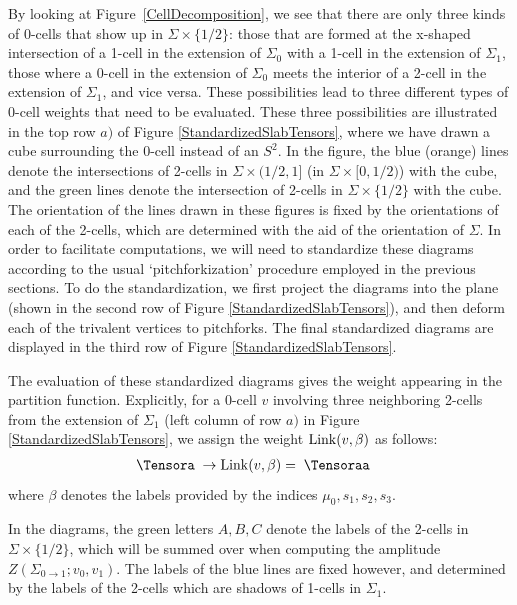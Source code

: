 \documentclass[12pt,a4paper]{article}
\newcounter{arrow}
\newcommand{\tp}{\otimes}
\newcommand{\ra}{\rightarrow}
\begin{document}
By looking at Figure~\ref{CellDecomposition}, we see that there are only three kinds of 0-cells that show up in 
$\Sigma \times \{1/2\}$: those that are formed at the x-shaped intersection of a 1-cell in the extension of $
\Sigma_0$ with a 1-cell in the extension of $\Sigma_1$, those where a 0-cell in the extension of $\Sigma_0$ 
meets the interior of a 2-cell in 
the extension of $\Sigma_1$, and vice versa. These possibilities lead to three different types of 0-cell weights that need to be evaluated. 
These three possibilities are illustrated in the top row $a)$ of Figure \ref{StandardizedSlabTensors}, where we have drawn a cube surrounding the 0-cell instead of an $S^2$.
In the figure, the blue (orange) lines denote 
the intersections of 2-cells in $\Sigma \times (1/2,1]$ (in $\Sigma \times [0,1/2)$) with the cube, 
and the green lines denote the intersection of 2-cells in $\Sigma \times \{1/2\}$ with the cube. 
The orientation of the lines drawn in these figures is fixed by the orientations of each of the 2-cells, 
which are determined with the aid of the orientation of $\Sigma$. 
In order to facilitate computations, we will need to standardize these diagrams according to the 
usual `pitchforkization' procedure employed in the previous sections. 
To do the standardization, we first project the diagrams into the plane (shown in the second row 
of Figure \ref{StandardizedSlabTensors}), and then deform each of the trivalent vertices 
to pitchforks. The final standardized diagrams are displayed in the third row of Figure \ref{StandardizedSlabTensors}.

The evaluation of these standardized diagrams gives the weight appearing in the partition function. 
Explicitly, for a 0-cell $v$ involving three neighboring 2-cells from the extension of $\Sigma_1$ (left column of row $a)$ in Figure \ref{StandardizedSlabTensors}, we assign the weight ${\rm Link}(v,\beta)$ as follows:
\begin{align}
\Tensora \; \ra {\rm Link}(v,\beta) &= \;  \Tensoraa %
\end{align}
where $\beta$ denotes the labels provided by the indices $\mu_0,s_1, s_2, s_3$.

In the diagrams, the green letters $A,B,C$ denote the labels of the 2-cells in $\Sigma \times \{1/2\}$, which will 
be summed over when computing the amplitude $Z(\Sigma_{0\ra1}; v_0, v_1)$. The labels of 
the blue lines are fixed however, and determined by the labels of the 2-cells which are shadows of 1-cells 
in $\Sigma_1$. 
\end{document}
